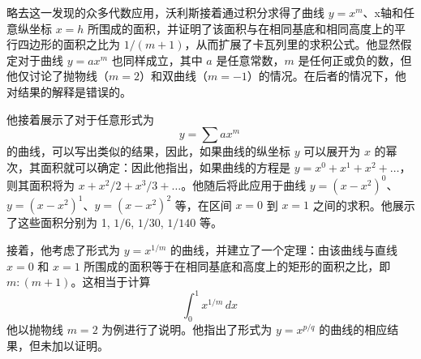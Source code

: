 略去这一发现的众多代数应用，沃利斯接着通过积分求得了曲线 \(y = x^m\)、x轴和任意纵坐标 \(x = h\) 所围成的面积，并证明了该面积与在相同基底和相同高度上的平行四边形的面积之比为 \(1 / (m + 1)\)，从而扩展了卡瓦列里的求积公式。他显然假定对于曲线 \(y = ax^m\) 也同样成立，其中 \(a\) 是任意常数，\(m\) 是任何正或负的数，但他仅讨论了抛物线（\(m = 2\)）和双曲线（\(m = -1\)）的情况。在后者的情况下，他对结果的解释是错误的。

他接着展示了对于任意形式为
\[
y = \sum a x^m~
\]
的曲线，可以写出类似的结果，因此，如果曲线的纵坐标 \(y\) 可以展开为 \(x\) 的幂次，其面积就可以确定：因此他指出，如果曲线的方程是 \(y = x^0 + x^1 + x^2 + \dots\)，则其面积将为 \(x + x^2/2 + x^3/3 + \dots\)。他随后将此应用于曲线 \(y = (x - x^2)^0\)、\(y = (x - x^2)^1\)、\(y = (x - x^2)^2\) 等，在区间 \(x = 0\) 到 \(x = 1\) 之间的求积。他展示了这些面积分别为 1, \(1/6\), \(1/30\), \(1/140\) 等。

接着，他考虑了形式为 \(y = x^{1/m}\) 的曲线，并建立了一个定理：由该曲线与直线 \(x = 0\) 和 \(x = 1\) 所围成的面积等于在相同基底和高度上的矩形的面积之比，即 \(m : (m + 1)\)。这相当于计算
\[
\int_{0}^{1} x^{1/m} \, dx~
\]
他以抛物线 \(m = 2\) 为例进行了说明。他指出了形式为 \(y = x^{p/q}\) 的曲线的相应结果，但未加以证明。